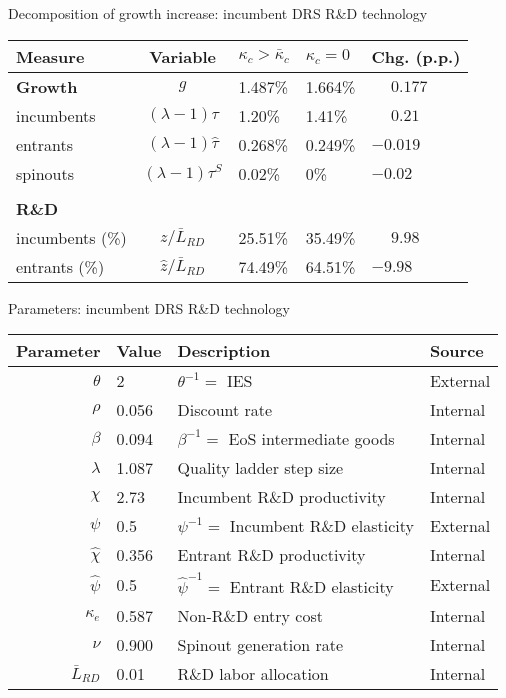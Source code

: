 \documentclass[english,usenames,dvipsnames]{beamer}
\begin{document}
\begin{frame}{Decomposition of growth increase: incumbent DRS R\&D technology}\label{decomposition_growth_increase:incumbentDRS}
	\hyperlink{reducing_kappa_c_table:incumbentDRS}{}
	\begin{table}
		\centering
		\footnotesize
		\begin{tabular}{lclll}
			\toprule \toprule
			Measure & Variable & $\kappa_c > \bar{\kappa}_c$ & $\kappa_c = 0$ & Chg. (p.p.) \tabularnewline
			\midrule
			\textbf{Growth} & $g$ & 1.487\% & 1.664\% & $\phantom{-}0.177$\tabularnewline
			\multicolumn{1}{l}{\quad incumbents} & $(\lambda -1) \tau$  & 1.20\% & 1.41\% & $\phantom{-}0.21$ \tabularnewline
			\multicolumn{1}{l}{\quad entrants} & $(\lambda -1) \hat{\tau}$ & 0.268\% & 0.249\% & $-0.019$ \tabularnewline
			\multicolumn{1}{l}{\quad spinouts} & $(\lambda -1) \tau^S$ & 0.02\% & 0\% & $-0.02$\tabularnewline
			\tabularnewline
			\textbf{R\&D} & & & & 
			\tabularnewline
			\multicolumn{1}{l}{\quad incumbents (\%)}  & $z / \bar{L}_{RD}$ & 25.51\% & 35.49\% & $\phantom{-}9.98$ \tabularnewline 		
			\multicolumn{1}{l}{\quad entrants (\%)}  & $\hat{z} / \bar{L}_{RD}$ & 74.49\% & 64.51\% & $-9.98$ \tabularnewline
			\bottomrule
		\end{tabular}
	\end{table}
\end{frame}

\begin{frame}{Parameters: incumbent DRS R\&D technology}\label{parameters:incumbentDRS}
	\hyperlink{reducing_kappa_c_table:incumbentDRS}{}
	\begin{table}[]
		\footnotesize
		\centering
		\begin{tabular}{rlll}
			\toprule \toprule
			Parameter & Value & Description & Source \tabularnewline
			\midrule
			$\theta$ & 2 & $\theta^{-1} = $ IES & External
			\tabularnewline
			$\rho$ & 0.056 & Discount rate  & Internal \tabularnewline
			$\beta$ & 0.094 & $\beta^{-1} = $ EoS intermediate goods & Internal \tabularnewline 
			$\lambda$ & 1.087 & Quality ladder step size & Internal
			\tabularnewline
			$\chi$ & 2.73 & Incumbent R\&D productivity & Internal
			\tabularnewline
			$\psi$ & 0.5 & $\psi^{-1} = $ Incumbent R\&D elasticity & External \tabularnewline
			$\hat{\chi}$ & 0.356 & Entrant R\&D productivity & Internal \tabularnewline 
			$\hat{\psi}$ & 0.5 & $\hat{\psi}^{-1} = $ Entrant R\&D elasticity & External \tabularnewline
			$\kappa_e$ & 0.587 & Non-R\&D entry cost & Internal \tabularnewline
			$\nu$ & 0.900 & Spinout generation rate  & Internal \tabularnewline
			$\bar{L}_{RD}$ & 0.01 & R\&D labor allocation  & Internal \tabularnewline
			\bottomrule
		\end{tabular}
	\end{table}
\end{frame}
\end{document}
